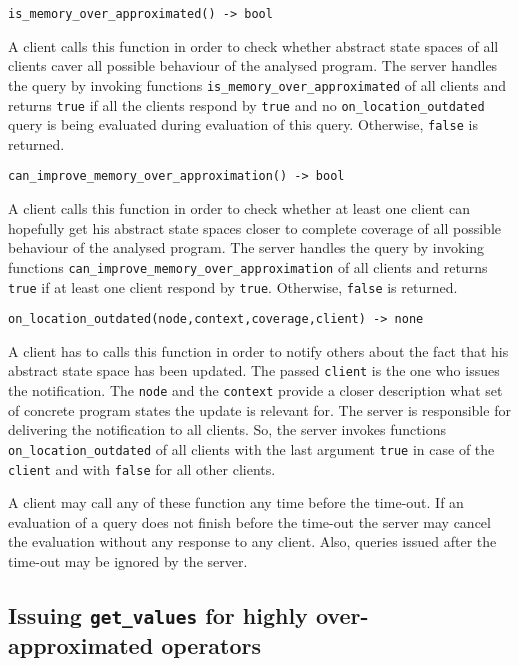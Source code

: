 \documentclass[envcountsame]{llncs}
\begin{document}
\noindent\texttt{is\_memory\_over\_approximated() -> bool}

A client calls this function in order to check whether abstract state spaces of
all clients caver all possible behaviour of the analysed program. The server
handles the query by invoking functions \texttt{is\_memory\_over\_approximated}
of all clients and returns \texttt{true} if all the clients respond by
\texttt{true} and no \texttt{on\_location\_outdated} query is being evaluated
during evaluation of this query. Otherwise, \texttt{false} is returned. \newline

\noindent\texttt{can\_improve\_memory\_over\_approximation() -> bool}

A client calls this function in order to check whether at least one client can
hopefully get his abstract state spaces closer to complete coverage of all possible
behaviour of the analysed program. The server handles the query by invoking
functions \texttt{can\_improve\_memory\_over\_approximation} of all clients and
returns \texttt{true} if at least one client respond by \texttt{true}.
Otherwise, \texttt{false} is returned. \newline

\noindent\texttt{on\_location\_outdated(node,context,coverage,client) -> none}

A client has to calls this function in order to notify others about the fact
that his abstract state space has been updated. The passed \texttt{client} is
the one who issues the notification. The \texttt{node} and the \texttt{context}
provide a closer description what set of concrete program states the update is
relevant for. The server is responsible for delivering the notification to all
clients. So, the server invokes functions \texttt{on\_location\_outdated} of all
clients with the last argument \texttt{true} in case of the \texttt{client} and
with \texttt{false} for all other clients. \newline

A client may call any of these function any time before the time-out. If an
evaluation of a query does not finish before the time-out the server may cancel
the evaluation without any response to any client. Also, queries issued after
the time-out may be ignored by the server.


\subsection{Issuing {\tt get\_values} for highly over-approximated operators}
\label{sec:IssueingGetValues}
\end{document}
